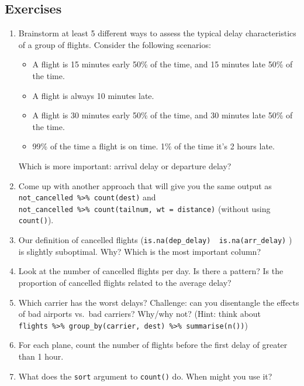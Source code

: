 \documentclass[]{book}
\newenvironment{Shaded}{\begin{snugshade}}{\end{snugshade}}
\newcommand{\KeywordTok}[1]{\textcolor[rgb]{0.13,0.29,0.53}{\textbf{{#1}}}}
\newcommand{\DataTypeTok}[1]{\textcolor[rgb]{0.13,0.29,0.53}{{#1}}}
\newcommand{\StringTok}[1]{\textcolor[rgb]{0.31,0.60,0.02}{{#1}}}
\newcommand{\CommentTok}[1]{\textcolor[rgb]{0.56,0.35,0.01}{\textit{{#1}}}}
\newcommand{\NormalTok}[1]{{#1}}
\begin{document}
\begin{Shaded}
\end{Shaded}

\subsection{Exercises}\label{exercises-11}

\begin{enumerate}
\def\labelenumi{\arabic{enumi}.}
\item
  Brainstorm at least 5 different ways to assess the typical delay
  characteristics of a group of flights. Consider the following
  scenarios:

  \begin{itemize}
  \item
    A flight is 15 minutes early 50\% of the time, and 15 minutes late
    50\% of the time.
  \item
    A flight is always 10 minutes late.
  \item
    A flight is 30 minutes early 50\% of the time, and 30 minutes late
    50\% of the time.
  \item
    99\% of the time a flight is on time. 1\% of the time it's 2 hours
    late.
  \end{itemize}

  Which is more important: arrival delay or departure delay?
\item
  Come up with another approach that will give you the same output as
  \texttt{not\_cancelled\ \%\textgreater{}\%\ count(dest)} and
  \texttt{not\_cancelled\ \%\textgreater{}\%\ count(tailnum,\ wt\ =\ distance)}
  (without using \texttt{count()}).
\item
  Our definition of cancelled flights
  (\texttt{is.na(dep\_delay)\ \textbar{}\ is.na(arr\_delay)} ) is
  slightly suboptimal. Why? Which is the most important column?
\item
  Look at the number of cancelled flights per day. Is there a pattern?
  Is the proportion of cancelled flights related to the average delay?
\item
  Which carrier has the worst delays? Challenge: can you disentangle the
  effects of bad airports vs.~bad carriers? Why/why not? (Hint: think
  about
  \texttt{flights\ \%\textgreater{}\%\ group\_by(carrier,\ dest)\ \%\textgreater{}\%\ summarise(n())})
\item
  For each plane, count the number of flights before the first delay of
  greater than 1 hour.
\item
  What does the \texttt{sort} argument to \texttt{count()} do. When
  might you use it?
\end{enumerate}
\end{document}
